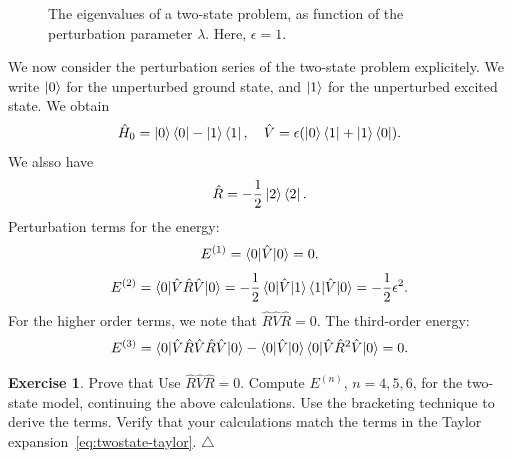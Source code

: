 \documentclass{report}
\theoremstyle{plain}
\theoremstyle{definition}
\newtheorem{exerc}{Exercise}[chapter]
\newcommand\xqed[1]{%
  \leavevmode\unskip\penalty9999 \hbox{}\nobreak\hfill
  \quad\hbox{#1}}
\newcommand\demo{\xqed{$\triangle$}}
\newenvironment{exercise}{\bigskip\begin{exerc}}{\demo\end{exerc}\bigskip}
\begin{document}
\begin{figure}
  \begin{center}
  \end{center}
  \caption{The eigenvalues of a two-state problem, as function of the
    perturbation parameter $\lambda$. Here, $\epsilon =
    1$.\label{fig:twostate}}
\end{figure}




We now consider the perturbation series of the two-state problem
explicitely. We write $\ket{0}$ for the unperturbed ground state, and
$\ket{1}$ for the unperturbed excited state. We obtain
\begin{equation}
  \hat{H}_0 = \ket{0}\bra{0} - \ket{1}\bra{1}, \quad \hat{V} =
  \epsilon(\ket{0}\bra{1} + \ket{1}\bra{0}).
\end{equation}
We alsso have
\begin{equation}
  \hat{R} = -\frac{1}{2}\ket{2}\bra{2}.
\end{equation}
Perturbation terms for the energy:
\begin{equation}
  E^{(1)} = \braket{0|\hat{V}|0} = 0.
\end{equation}
\begin{equation}
  E^{(2)} = \braket{0|\hat{V}\hat{R}\hat{V}|0} =
  -\frac{1}{2}\braket{0|\hat{V}|1}\braket{1|\hat{V}|0} = -\frac{1}{2}\epsilon^2.
\end{equation}
For the higher order terms, we note that $\hat{R}\hat{V}\hat{R} = 0$.
The third-order energy:
\begin{equation}
  E^{(3)} = \braket{0|\hat{V}\hat{R}\hat{V}\hat{R}\hat{V}|0} -
  \braket{0|\hat{V}|0}\braket{0|\hat{V}\hat{R}^2\hat{V}|0} = 0.
\end{equation}

\begin{exercise}
  Prove that Use $\hat{R}\hat{V}\hat{R}=0$.
  Compute $E^{(n)}$, $n=4,5,6$, for the two-state model, continuing
  the above calculations. Use the bracketing technique to derive the
  terms. Verify that your calculations match the terms in the Taylor
  expansion~\ref{eq:twostate-taylor}.
\end{exercise}
\end{document}

